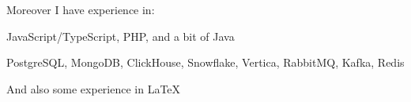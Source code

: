 Moreover I have experience in:
\begin{bulist}
\item JavaScript/TypeScript, PHP, and a bit of Java
\item PostgreSQL, MongoDB, ClickHouse, Snowflake, Vertica, RabbitMQ, Kafka,
  Redis
\end{bulist}
And also some experience in \LaTeX
